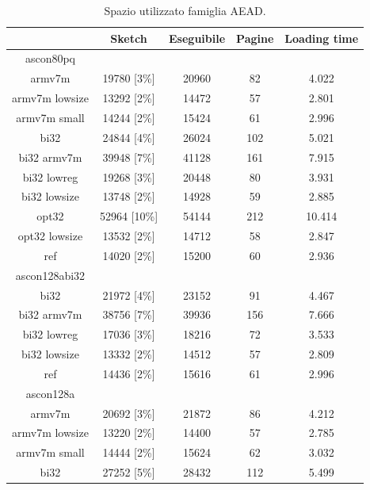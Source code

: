 \documentclass[12pt,a4paper,italian]{report}
\begin{document}
\begin{table}[h]
    \caption{Spazio utilizzato famiglia AEAD.}
    \centering
	\begin{tabular}{|c|c|c|c|c|}
		\hline
         & Sketch & Eseguibile & Pagine & Loading time \\
        \hline
        ascon80pq & & & & \\
        \hline
        armv7m & 19780 [3\%] & 20960 & 82 & 4.022 \\
        \hline
        armv7m lowsize & 13292 [2\%] & 14472 & 57 & 2.801 \\
        \hline
        armv7m small & 14244 [2\%] & 15424 & 61 & 2.996 \\
        \hline
        bi32 & 24844 [4\%] & 26024 & 102 & 5.021 \\
        \hline
        bi32 armv7m & 39948 [7\%] & 41128 & 161 & 7.915 \\
        \hline
        bi32 lowreg & 19268 [3\%] & 20448 & 80 & 3.931 \\
        \hline
        bi32 lowsize & 13748 [2\%] & 14928 & 59 & 2.885 \\
        \hline
        opt32 & 52964 [10\%] & 54144 & 212 & 10.414 \\
        \hline
        opt32 lowsize & 13532 [2\%] & 14712 & 58 & 2.847 \\
        \hline
        ref & 14020 [2\%] & 15200 & 60 & 2.936 \\
        \hline
        ascon128abi32 & & & & \\
        \hline
        bi32 & 21972 [4\%] & 23152 & 91 & 4.467 \\
        \hline
        bi32 armv7m & 38756 [7\%] & 39936 & 156 & 7.666 \\
        \hline
        bi32 lowreg & 17036 [3\%] & 18216 & 72 & 3.533 \\
        \hline
        bi32 lowsize & 13332 [2\%] & 14512 & 57 & 2.809 \\
        \hline
        ref & 14436 [2\%] & 15616 & 61 & 2.996 \\
        \hline
        ascon128a & & & & \\
        \hline
        armv7m & 20692 [3\%] & 21872 & 86 & 4.212 \\
        \hline
        armv7m lowsize & 13220 [2\%] & 14400 & 57 & 2.785 \\
        \hline
        armv7m small & 14444 [2\%] & 15624 & 62 & 3.032 \\
        \hline
        bi32 & 27252 [5\%] & 28432 & 112 & 5.499 \\

\end{tabular}
\end{table}
\end{document}
